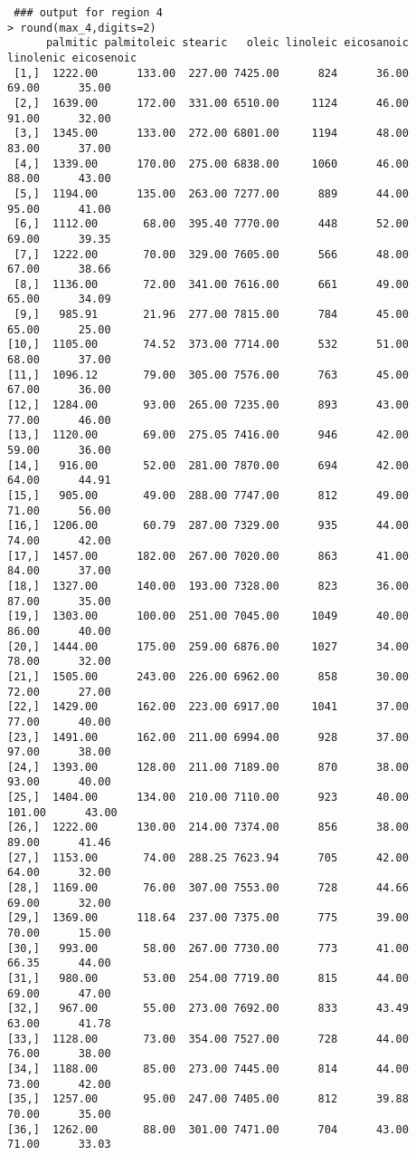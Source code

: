 \documentclass[11pt]{article}
\begin{document}
\begin{verbatim}
 ### output for region 4
> round(max_4,digits=2)
      palmitic palmitoleic stearic   oleic linoleic eicosanoic linolenic eicosenoic
 [1,]  1222.00      133.00  227.00 7425.00      824      36.00     69.00      35.00
 [2,]  1639.00      172.00  331.00 6510.00     1124      46.00     91.00      32.00
 [3,]  1345.00      133.00  272.00 6801.00     1194      48.00     83.00      37.00
 [4,]  1339.00      170.00  275.00 6838.00     1060      46.00     88.00      43.00
 [5,]  1194.00      135.00  263.00 7277.00      889      44.00     95.00      41.00
 [6,]  1112.00       68.00  395.40 7770.00      448      52.00     69.00      39.35
 [7,]  1222.00       70.00  329.00 7605.00      566      48.00     67.00      38.66
 [8,]  1136.00       72.00  341.00 7616.00      661      49.00     65.00      34.09
 [9,]   985.91       21.96  277.00 7815.00      784      45.00     65.00      25.00
[10,]  1105.00       74.52  373.00 7714.00      532      51.00     68.00      37.00
[11,]  1096.12       79.00  305.00 7576.00      763      45.00     67.00      36.00
[12,]  1284.00       93.00  265.00 7235.00      893      43.00     77.00      46.00
[13,]  1120.00       69.00  275.05 7416.00      946      42.00     59.00      36.00
[14,]   916.00       52.00  281.00 7870.00      694      42.00     64.00      44.91
[15,]   905.00       49.00  288.00 7747.00      812      49.00     71.00      56.00
[16,]  1206.00       60.79  287.00 7329.00      935      44.00     74.00      42.00
[17,]  1457.00      182.00  267.00 7020.00      863      41.00     84.00      37.00
[18,]  1327.00      140.00  193.00 7328.00      823      36.00     87.00      35.00
[19,]  1303.00      100.00  251.00 7045.00     1049      40.00     86.00      40.00
[20,]  1444.00      175.00  259.00 6876.00     1027      34.00     78.00      32.00
[21,]  1505.00      243.00  226.00 6962.00      858      30.00     72.00      27.00
[22,]  1429.00      162.00  223.00 6917.00     1041      37.00     77.00      40.00
[23,]  1491.00      162.00  211.00 6994.00      928      37.00     97.00      38.00
[24,]  1393.00      128.00  211.00 7189.00      870      38.00     93.00      40.00
[25,]  1404.00      134.00  210.00 7110.00      923      40.00    101.00      43.00
[26,]  1222.00      130.00  214.00 7374.00      856      38.00     89.00      41.46
[27,]  1153.00       74.00  288.25 7623.94      705      42.00     64.00      32.00
[28,]  1169.00       76.00  307.00 7553.00      728      44.66     69.00      32.00
[29,]  1369.00      118.64  237.00 7375.00      775      39.00     70.00      15.00
[30,]   993.00       58.00  267.00 7730.00      773      41.00     66.35      44.00
[31,]   980.00       53.00  254.00 7719.00      815      44.00     69.00      47.00
[32,]   967.00       55.00  273.00 7692.00      833      43.49     63.00      41.78
[33,]  1128.00       73.00  354.00 7527.00      728      44.00     76.00      38.00
[34,]  1188.00       85.00  273.00 7445.00      814      44.00     73.00      42.00
[35,]  1257.00       95.00  247.00 7405.00      812      39.88     70.00      35.00
[36,]  1262.00       88.00  301.00 7471.00      704      43.00     71.00      33.03

\end{verbatim}
\end{document}
